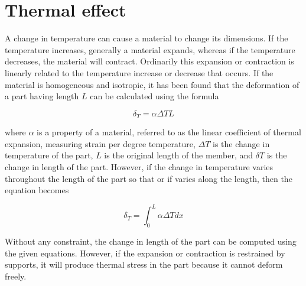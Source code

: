 \documentclass[
10pt,
a4paper,
openany,
svgnames,
]{book} %
\begin{document}
\section{Thermal effect}

A change in temperature can cause a material to change its dimensions. If the temperature increases, generally a material expands, whereas if the temperature decreases, the material will contract. Ordinarily this expansion or contraction is linearly related to the temperature increase or decrease that occurs. If the material is homogeneous and isotropic, it has been found that the deformation of a part having length $L$ can be calculated using the formula

\begin{equation}
  \delta _T = \alpha \Delta TL
\end{equation}

where $\alpha$ is a property of a material, referred to as the linear coefficient of thermal expansion, measuring strain per degree temperature, $\Delta T$ is the change in temperature of the part, $L$ is the original length of the member, and $\delta T$ is the change in length of the part. However, if the change in temperature varies throughout the length of the part so that or if varies along the length, then the equation becomes

\begin{equation}
  \delta _T = \int_0^L \alpha \Delta Tdx
\end{equation}

Without any constraint, the change in length of the part can be computed using the given equations. However, if the expansion or contraction is restrained by supports, it will produce thermal stress in the part because it cannot deform freely.
\end{document}
